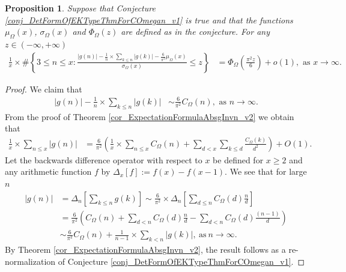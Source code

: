 \documentclass[11pt,reqno,a4letter]{article}
\newcommand{\hlocalref}[1]{\hyperref[#1]{\ref{#1}}}
\numberwithin{equation}{section}
\numberwithin{figure}{section}
\numberwithin{table}{section}
\theoremstyle{plain}
\newtheorem{prop}[theorem]{Proposition}
\numberwithin{theorem}{section}
\theoremstyle{definition}
\begin{document}
\begin{prop}
\label{cor_CLT_VII} 
Suppose that Conjecture \hlocalref{conj_DetFormOfEKTypeThmForCOmegan_v1} is true and that 
the functions $\mu_{\Omega}(x)$, $\sigma_{\Omega}(x)$ and $\Phi_{\Omega}(z)$ are defined as in the conjecture. 
For any $z \in (-\infty, +\infty)$ 
\begin{align*} 
\frac{1}{x} \times \#\left\{3 \leq n \leq x: \frac{|g(n)| - 
     \frac{1}{n} \times \sum_{k \leq n} |g(k)| - \frac{6}{\pi^2} \mu_{\Omega}(x)}{\sigma_{\Omega}(x)} 
     \leq z\right\} & = 
     \Phi_{\Omega}\left(\frac{\pi^2 z}{6}\right) + o(1), 
     \text{ as } x \rightarrow \infty.
\end{align*} 
\end{prop} 
\begin{proof} 
We claim that 
\begin{align*} 
|g(n)| - \frac{1}{n} \times \sum_{k \leq n} |g(k)| & \sim \frac{6}{\pi^2} C_{\Omega}(n), 
     \text{\ as\ } n \rightarrow \infty. 
\end{align*} 
From the proof of Theorem \hlocalref{cor_ExpectationFormulaAbsgInvn_v2} 
we obtain that 
\begin{align*} 
\frac{1}{x} \times \sum_{n \leq x} |g(n)| & = 
     \frac{6}{\pi^2} \left(\frac{1}{x} \times \sum_{n \leq x} C_{\Omega}(n) + \sum_{d<x} 
     \sum_{k \leq d} \frac{C_{\Omega}(k)}{d^2}\right) + O(1). 
\end{align*} 
Let the backwards difference operator with respect to $x$ 
be defined for $x \geq 2$ and any arithmetic function $f$ by 
$\Delta_x[f] := f(x) - f(x-1)$. 
We see that for large $n$ 
\begin{align*} 
     |g(n)| & = \Delta_n\left[\sum_{k \leq n} g(k)\right]  
     \sim \frac{6}{\pi^2} \times 
     \Delta_n\left[\sum_{d \leq n} C_{\Omega}(d) \frac{n}{d}\right] \\ 
     & = \frac{6}{\pi^2}\left(C_{\Omega}(n) + \sum_{d < n} C_{\Omega}(d) \frac{n}{d} - 
     \sum_{d<n} C_{\Omega}(d) \frac{(n-1)}{d}\right) \\ 
     & \sim \frac{6}{\pi^2} C_{\Omega}(n) + \frac{1}{n-1} \times \sum_{k < n} |g(k)|, 
     \mathrm{\ as\ } n \rightarrow \infty. 
\end{align*}  
By Theorem \hlocalref{cor_ExpectationFormulaAbsgInvn_v2}, 
the result follows as a re-normalization of Conjecture \hlocalref{conj_DetFormOfEKTypeThmForCOmegan_v1}. 
\end{proof} 
\end{document}
